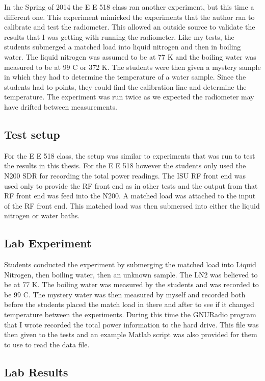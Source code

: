 In the Spring of 2014 the E E 518 class ran another experiment, but this time a different one.  This experiment mimicked the experiments that the author ran to calibrate and test the radiometer.  This allowed an outside source to validate the results that I was getting with running the radiometer.  Like my tests, the students submerged a matched load into liquid nitrogen and then in boiling water.  The liquid nitrogen was assumed to be at 77 K and the boiling water was measured to be at 99 C or 372 K.  The students were then given a mystery sample in which they had to determine the temperature of a water sample.  Since the students had to points, they could find the calibration line and determine the temperature.  The experiment was run twice as we expected the radiometer may have drifted between measurements.  

\subsection{Test setup}
For the E E 518 class, the setup was similar to experiments that was run to test the results in this thesis.  For the E E 518 however the students only used the N200 SDR for recording the total power readings.  The ISU RF front end was used only to provide the RF front end as in other tests and the output from that RF front end was feed into the N200.  A matched load was attached to the input of the RF front end.  This matched load was then submersed into either the liquid nitrogen or water baths.  

\subsection{Lab Experiment}

Students conducted the experiment by submerging the matched load into Liquid Nitrogen, then boiling water, then an unknown sample.  The LN2 was believed to be at 77 K.  The boiling water was measured by the students and was recorded to be 99 C.  The mystery water was then measured by myself and recorded both before the students placed the match load in there and after to see if it changed temperature between the experiments.  During this time the GNURadio program that I wrote recorded the total power information to the hard drive.  This file was then given to the tests and an example Matlab script was also provided for them to use to read the data file.

\subsection{Lab Results}

